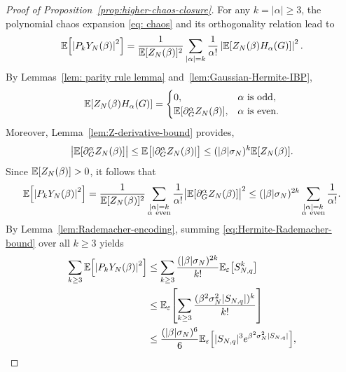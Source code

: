 \documentclass[../CLT_SYK.tex]{subfiles}
\begin{document}
\begin{proof}[Proof of Proposition~\ref{prop:higher-chaos-closure}]
  For any $k = |\alpha| \geq 3$, the polynomial chaos expansion \eqref{eq: chaos} and its orthogonality relation lead to
  \[
    \E\mleft[\left|P_k Y_N(\beta)\right|^2\mright]
    =
      \frac{1}{\E[Z_N(\beta)]^2}
      \sum_{|\alpha|=k}\frac{1}{\alpha!}
      \left|
        \E\mleft[Z_N(\beta) H_\alpha(G)\mright]
      \right|^2.
  \]
  By Lemmas~\ref{lem: parity rule lemma} and~\ref{lem:Gaussian-Hermite-IBP},
  \[
    \E\mleft[Z_N(\beta)H_\alpha(G)\mright]
    =
      \begin{cases}
        0,                                & \alpha \text{ is odd},  \\
        \E[\partial_G^\alpha Z_N(\beta)], & \alpha \text{ is even}.
      \end{cases}
  \]
  Moreover, Lemma~\ref{lem:Z-derivative-bound} provides,
  \[
    \bigl|\E[\partial_G^\alpha Z_N(\beta)]\bigr|
    \leq
      \E\bigl[\left|\partial_G^\alpha Z_N(\beta)\right|\bigr]
    \leq
      (|\beta|\sigma_N)^{k}
      \E\mleft[Z_N(\beta)\mright].
  \]
  Since $\mathbb E[Z_N(\beta)] > 0$, it follows that
  \begin{equation}
    \E\mleft[\left|P_k Y_N(\beta)\right|^2\mright]
    =
      \frac{1}{\E[Z_N(\beta)]^2}
      \sum_{
        \substack{
          |\alpha| = k \\
          \alpha\ \mathrm{even}
        }
      }
      \frac{1}{\alpha!}
      \bigl|\E\mleft[\partial_G^\alpha Z_N(\beta)\mright]\bigr|^2
    \leq (|\beta| \sigma_N)^{2 k}
      \sum_{
        \substack{
          |\alpha| = k \\
          \alpha\ \mathrm{even}
        }
      }
      \frac{1}{\alpha!}.
    \label{eq:Hermite-Rademacher-bound}
  \end{equation}
  By Lemma~\ref{lem:Rademacher-encoding}, summing \eqref{eq:Hermite-Rademacher-bound} over all $k \geq 3$ yields
  \begin{align}
    \sum_{k\geq3}\E\mleft[\left|P_k Y_N(\beta)\right|^2\mright]
    & \leq
      \sum_{k\geq3}
      \frac{(|\beta| \sigma_N)^{2 k}}{k!}
      \E_\varepsilon\mleft[S_{N,q}^k\mright] \notag\\
    & \leq
      \E_\varepsilon\mleft[
        \sum_{k\geq3}
        \frac{(\beta^2 \sigma_N^2 |S_{N,q}|)^k}{k!}
      \mright] \notag\\
    & \leq
      \frac{(|\beta| \sigma_N)^{6}}{6}
      \E_\varepsilon\mleft[
        |S_{N,q}|^3
        e^{\beta^2 \sigma_N^2 |S_{N,q}|}
      \mright],

\end{align}
\end{proof}
\end{document}
